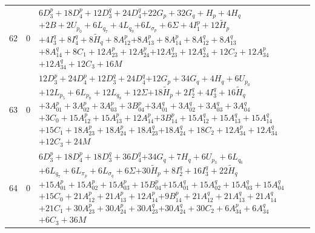 \documentclass[11pt,a4paper]{article}
\theoremstyle{remark}
\begin{document}
\begin{longtable}{rrp{12.7cm}}
62&0&\( 6D_3^p + 18D_4^p + 12D_3^q + 24D_4^q \)\newline\( + 22G_p + 32G_q + H_p + 4H_q \)\newline\( + 2B + 2U_{p_{0}} + 6L_{q_{7}} + 4L_{q_{9}} \)\newline\( + 6L_{\sigma_p} + 6\Sigma + 4I_1^p + 12\widetilde H_p \)\newline\( + 4I_3^q + 8I_4^q + 8\widetilde H_q + 8A_{12}^p \)\newline\( + 8A_{13}^p + 8A_{14}^p + 8A_{12}^q + 8A_{13}^q \)\newline\( + 8A_{14}^q + 8C_1 + 12A_{23}^p + 12A_{24}^p \)\newline\( + 12A_{23}^q + 12A_{24}^q + 12C_2 + 12A_{34}^p \)\newline\( + 12A_{34}^q + 12C_3 + 16M \)\\[3pt]
63&0&\( 12D_3^p + 24D_4^p + 12D_3^q + 24D_4^q \)\newline\( + 12G_p + 34G_q + 4H_q + 6U_{p_{0}} \)\newline\( + 12L_{p_{5}} + 6L_{p_{8}} + 12L_{q_{8}} + 12\Sigma \)\newline\( + 18\widetilde H_p + 2I_2^q + 4I_3^q + 16\widetilde H_q \)\newline\( + 3A_{01}^p + 3A_{02}^p + 3A_{03}^p + 3B_{04}^p \)\newline\( + 3A_{01}^q + 3A_{02}^q + 3A_{03}^q + 3A_{04}^q \)\newline\( + 3C_0 + 15A_{12}^p + 15A_{13}^p + 12A_{14}^p \)\newline\( + 3B_{14}^p + 15A_{12}^q + 15A_{13}^q + 15A_{14}^q \)\newline\( + 15C_1 + 18A_{23}^p + 18A_{24}^p + 18A_{23}^q \)\newline\( + 18A_{24}^q + 18C_2 + 12A_{34}^p + 12A_{34}^q \)\newline\( + 12C_3 + 24M \)\\[3pt]
64&0&\( 6D_3^p + 18D_4^p + 18D_3^q + 36D_4^q \)\newline\( + 34G_q + 7H_q + 6U_{p_{3}} + 6L_{q_{6}} \)\newline\( + 6L_{q_{7}} + 6L_{\pi_p} + 6L_{\sigma_q} + 6\Sigma \)\newline\( + 30\widetilde H_p + 8I_2^q + 16I_3^q + 22\widetilde H_q \)\newline\( + 15A_{01}^p + 15A_{02}^p + 15A_{03}^p + 15B_{04}^p \)\newline\( + 15A_{01}^q + 15A_{02}^q + 15A_{03}^q + 15A_{04}^q \)\newline\( + 15C_0 + 21A_{12}^p + 21A_{13}^p + 12A_{14}^p \)\newline\( + 9B_{14}^p + 21A_{12}^q + 21A_{13}^q + 21A_{14}^q \)\newline\( + 21C_1 + 30A_{23}^p + 30A_{24}^p + 30A_{23}^q \)\newline\( + 30A_{24}^q + 30C_2 + 6A_{34}^p + 6A_{34}^q \)\newline\( + 6C_3 + 36M \)\\[3pt]

\end{longtable}
\end{document}
